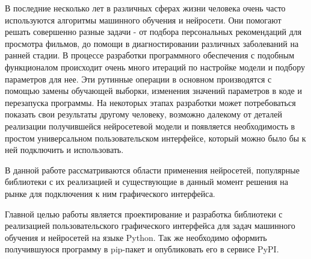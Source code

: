 \intro
В последние несколько лет в различных сферах жизни человека очень часто используются алгоритмы машинного обучения и нейросети. Они помогают решать совершенно разные задачи - от подбора персональных рекомендаций для просмотра фильмов, до помощи в диагностировании различных заболеваний на ранней стадии. В процессе разработки программного обеспечения с подобным функционалом происходит очень много итераций по настройке модели и подбору параметров для нее. Эти рутинные операции в основном производятся с помощью замены обучающей выборки, изменения значений параметров в коде и перезапуска программы. На некоторых этапах разработки может потребоваться показать свои результаты другому человеку, возможно далекому от деталей реализации получившейся нейросетевой модели и появляется необходимость в простом универсальном пользовательском интерфейсе, который можно было бы к ней подключить и использовать.

В данной работе рассматриваются области применения нейросетей, популярные библиотеки с их реализацией и существующие в данный момент решения на рынке для подключения к ним графического интерфейса. 

Главной целью работы является проектирование и разработка библиотеки с реализацией пользовательского графического интерфейса для задач машинного обучения и нейросетей на языке Python. Так же необходимо оформить получившуюся программу в pip-пакет и опубликовать его в сервисе PyPI.